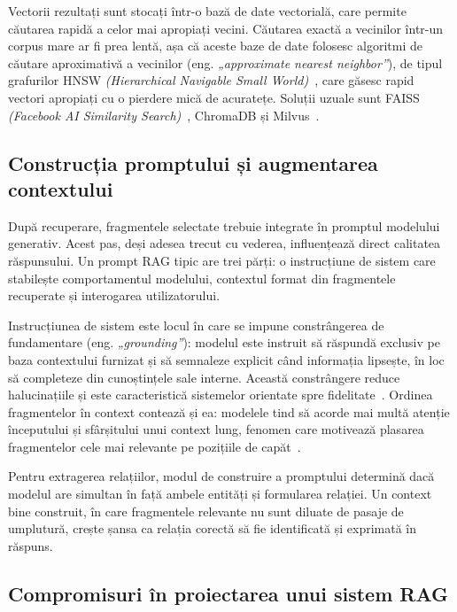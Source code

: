 Vectorii rezultați sunt stocați într-o bază de date vectorială, care permite căutarea rapidă a celor mai apropiați vecini. Căutarea exactă a vecinilor într-un corpus mare ar fi prea lentă, așa că aceste baze de date folosesc algoritmi de căutare aproximativă a vecinilor (eng. \textit{„approximate nearest neighbor”}), de tipul grafurilor HNSW \textit{(Hierarchical Navigable Small World)}~\cite{malkov2018hnsw}, care găsesc rapid vectori apropiați cu o pierdere mică de acuratețe. Soluții uzuale sunt FAISS \textit{(Facebook AI Similarity Search)}~\cite{johnson2019faiss}, ChromaDB și Milvus~\cite{wang2021milvus}.

\subsection{Construcția promptului și augmentarea contextului}

După recuperare, fragmentele selectate trebuie integrate în promptul modelului generativ. Acest pas, deși adesea trecut cu vederea, influențează direct calitatea răspunsului. Un prompt RAG tipic are trei părți: o instrucțiune de sistem care stabilește comportamentul modelului, contextul format din fragmentele recuperate și interogarea utilizatorului.

Instrucțiunea de sistem este locul în care se impune constrângerea de fundamentare (eng. \textit{„grounding”}): modelul este instruit să răspundă exclusiv pe baza contextului furnizat și să semnaleze explicit când informația lipsește, în loc să completeze din cunoștințele sale interne. Această constrângere reduce halucinațiile și este caracteristică sistemelor orientate spre fidelitate~\cite{asai2023self}. Ordinea fragmentelor în context contează și ea: modelele tind să acorde mai multă atenție începutului și sfârșitului unui context lung, fenomen care motivează plasarea fragmentelor cele mai relevante pe pozițiile de capăt~\cite{jin2024long}.

Pentru extragerea relațiilor, modul de construire a promptului determină dacă modelul are simultan în față ambele entități și formularea relației. Un context bine construit, în care fragmentele relevante nu sunt diluate de pasaje de umplutură, crește șansa ca relația corectă să fie identificată și exprimată în răspuns.

\subsection{Compromisuri în proiectarea unui sistem RAG}

